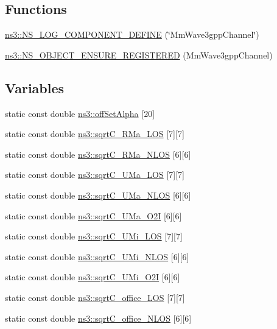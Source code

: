 \subsection*{Functions}
\begin{DoxyCompactItemize}
\item 
\hyperlink{namespacens3_a6ab0684a70c4a13cdc6331c47d03fc3b}{ns3\+::\+N\+S\+\_\+\+L\+O\+G\+\_\+\+C\+O\+M\+P\+O\+N\+E\+N\+T\+\_\+\+D\+E\+F\+I\+NE} (\char`\"{}Mm\+Wave3gpp\+Channel\char`\"{})
\item 
\hyperlink{namespacens3_a7f27eee8a3a14e18de99eae1b7ed4ff8}{ns3\+::\+N\+S\+\_\+\+O\+B\+J\+E\+C\+T\+\_\+\+E\+N\+S\+U\+R\+E\+\_\+\+R\+E\+G\+I\+S\+T\+E\+R\+ED} (Mm\+Wave3gpp\+Channel)
\end{DoxyCompactItemize}
\subsection*{Variables}
\begin{DoxyCompactItemize}
\item 
static const double \hyperlink{namespacens3_a2344173eeb094a196c555a159e87bc6f}{ns3\+::off\+Set\+Alpha} \mbox{[}20\mbox{]}
\item 
static const double \hyperlink{namespacens3_a94d0f9da9e007c8579b09abe4c003e51}{ns3\+::sqrt\+C\+\_\+\+R\+Ma\+\_\+\+L\+OS} \mbox{[}7\mbox{]}\mbox{[}7\mbox{]}
\item 
static const double \hyperlink{namespacens3_a5956658e14c03e840f117722cf0bbbb6}{ns3\+::sqrt\+C\+\_\+\+R\+Ma\+\_\+\+N\+L\+OS} \mbox{[}6\mbox{]}\mbox{[}6\mbox{]}
\item 
static const double \hyperlink{namespacens3_a6f06e6813ea09282bd2323f4499220b5}{ns3\+::sqrt\+C\+\_\+\+U\+Ma\+\_\+\+L\+OS} \mbox{[}7\mbox{]}\mbox{[}7\mbox{]}
\item 
static const double \hyperlink{namespacens3_ad5e4bf11a5acb312f0bc8a5326e39df2}{ns3\+::sqrt\+C\+\_\+\+U\+Ma\+\_\+\+N\+L\+OS} \mbox{[}6\mbox{]}\mbox{[}6\mbox{]}
\item 
static const double \hyperlink{namespacens3_a39f2ef4de462777b91687b3f7f9d72f8}{ns3\+::sqrt\+C\+\_\+\+U\+Ma\+\_\+\+O2I} \mbox{[}6\mbox{]}\mbox{[}6\mbox{]}
\item 
static const double \hyperlink{namespacens3_a34f94bc21850882c7e480c4a8bc5036d}{ns3\+::sqrt\+C\+\_\+\+U\+Mi\+\_\+\+L\+OS} \mbox{[}7\mbox{]}\mbox{[}7\mbox{]}
\item 
static const double \hyperlink{namespacens3_a6fd885aaf93f9727bfb2331d67dffec7}{ns3\+::sqrt\+C\+\_\+\+U\+Mi\+\_\+\+N\+L\+OS} \mbox{[}6\mbox{]}\mbox{[}6\mbox{]}
\item 
static const double \hyperlink{namespacens3_ac79a159d07651583d79482e4429cf74a}{ns3\+::sqrt\+C\+\_\+\+U\+Mi\+\_\+\+O2I} \mbox{[}6\mbox{]}\mbox{[}6\mbox{]}
\item 
static const double \hyperlink{namespacens3_a39c2b4fa4d7bd533a6b2ecfa96b848ee}{ns3\+::sqrt\+C\+\_\+office\+\_\+\+L\+OS} \mbox{[}7\mbox{]}\mbox{[}7\mbox{]}
\item 
static const double \hyperlink{namespacens3_acc73441dd0287914f581fca4a7b36f3c}{ns3\+::sqrt\+C\+\_\+office\+\_\+\+N\+L\+OS} \mbox{[}6\mbox{]}\mbox{[}6\mbox{]}
\end{DoxyCompactItemize}
